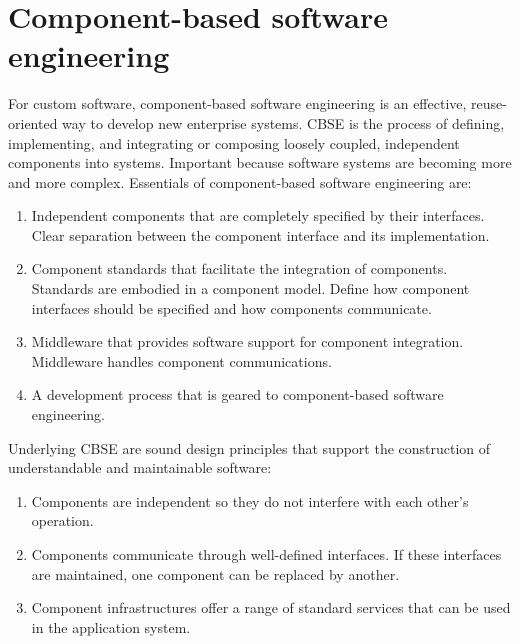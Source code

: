 \documentclass{article}
\begin{document}
 
\setcounter{section}{16}
\section{Component-based software engineering}
For custom software, component-based software engineering is an effective, reuse-oriented way to develop new enterprise systems.
CBSE is the process of defining, implementing, and integrating or composing loosely coupled, independent components into systems.
Important because software systems are becoming more and more complex.
Essentials of component-based software engineering are:
\begin{enumerate}
\item Independent components that are completely specified by their interfaces.  Clear separation between the component interface and its implementation.
\item Component standards that facilitate the integration of components.  Standards are embodied in a component model.  Define how component interfaces should be specified and how components communicate.
\item Middleware that provides software support for component integration.  Middleware handles component communications.
\item A development process that is geared to component-based software engineering.
\end{enumerate}
Underlying CBSE are sound design principles that support the construction of understandable and maintainable software:
\begin{enumerate}
\item Components are independent so they do not interfere with each other's operation.
\item Components communicate through well-defined interfaces.  If these interfaces are maintained, one component can be replaced by another.
\item Component infrastructures offer a range of standard services that can be used in the application system.
\end{enumerate}
\end{document}

